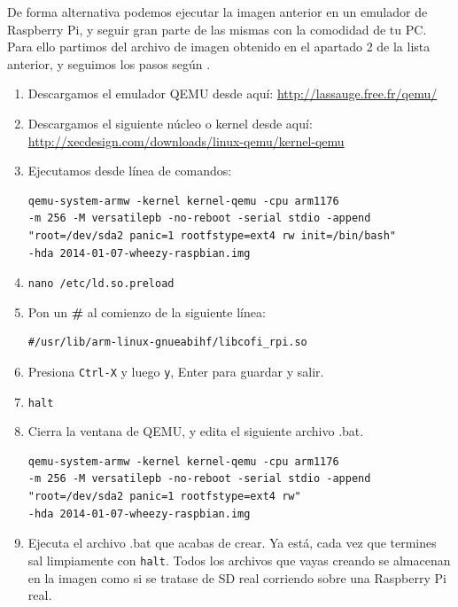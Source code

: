 De forma alternativa podemos ejecutar la imagen anterior en un emulador de
Raspberry Pi, y seguir gran parte de las mismas con la comodidad de tu PC. Para
ello partimos del archivo de imagen obtenido en el apartado 2 de la lista anterior,
y seguimos los pasos según \cite{QEMU}.

\begin{enumerate}
  \item Descargamos el emulador QEMU desde aquí: \newline
\hspace{2.5cm}
\textcolor{blue}{
  \href{http://lassauge.free.fr/qemu/}
  {http://lassauge.free.fr/qemu/}}
  \item Descargamos el siguiente núcleo o kernel desde aquí: \newline
\hspace{2.5cm}
\textcolor{blue}{
  \href{http://xecdesign.com/downloads/linux-qemu/kernel-qemu}
  {http://xecdesign.com/downloads/linux-qemu/kernel-qemu}}
  \item Ejecutamos desde línea de comandos:
\begin{lstlisting}
qemu-system-armw -kernel kernel-qemu -cpu arm1176
-m 256 -M versatilepb -no-reboot -serial stdio -append
"root=/dev/sda2 panic=1 rootfstype=ext4 rw init=/bin/bash"
-hda 2014-01-07-wheezy-raspbian.img
\end{lstlisting}
  \item {\tt nano /etc/ld.so.preload}
  \item Pon un {\bf \#} al comienzo de la siguiente línea:
\begin{lstlisting}
#/usr/lib/arm-linux-gnueabihf/libcofi_rpi.so
\end{lstlisting}
  \item Presiona {\tt Ctrl-X} y luego {\tt y}, Enter para guardar y salir.
  \item {\tt halt}
  \item Cierra la ventana de QEMU, y edita el siguiente archivo .bat.
\begin{lstlisting}
qemu-system-armw -kernel kernel-qemu -cpu arm1176
-m 256 -M versatilepb -no-reboot -serial stdio -append
"root=/dev/sda2 panic=1 rootfstype=ext4 rw"
-hda 2014-01-07-wheezy-raspbian.img
\end{lstlisting}
  \item Ejecuta el archivo .bat que acabas de crear. Ya está, cada vez que
termines sal limpiamente con {\tt halt}. Todos los archivos que vayas creando
se almacenan en la imagen como si se tratase de SD real corriendo sobre una
Raspberry Pi real.
\end{enumerate}

